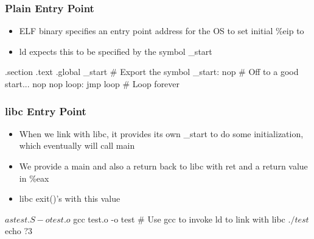 \documentclass[11pt,xcolor=dvipsnames]{beamer}
\begin{document}
\begin{frame}[fragile,t]
\frametitle{Plain Entry Point}
\begin{itemize}
  \item ELF binary specifies an entry point address for the OS to set initial {\ttfamily \%eip} to
  \item {\ttfamily ld} expects this to be specified by the symbol {\ttfamily \_start}
\end{itemize}
\pause
\begin{gascode}
.section .text
.global _start    # Export the symbol
_start:
  nop             # Off to a good start...
  nop
  nop
  loop: jmp loop  # Loop forever
\end{gascode}
\end{frame}

\begin{frame}[fragile,t]
\frametitle{{\ttfamily libc} Entry Point}
\begin{itemize}
  \item When we link with {\ttfamily libc}, it provides its own {\ttfamily \_start} to do some initialization, which eventually will call {\ttfamily main}
  \item We provide a {\ttfamily main} and also a return back to libc with {\ttfamily ret} and a return value in {\ttfamily \%eax}
  \item libc {\ttfamily exit()'s} with this value
\end{itemize}
\pause
{}
\begin{textcode}
$ as test.S -o test.o
$ gcc test.o -o test    # Use gcc to invoke ld to link with libc
$ ./test
$ echo $?
3
$
\end{textcode}
\end{frame}
\end{document}
